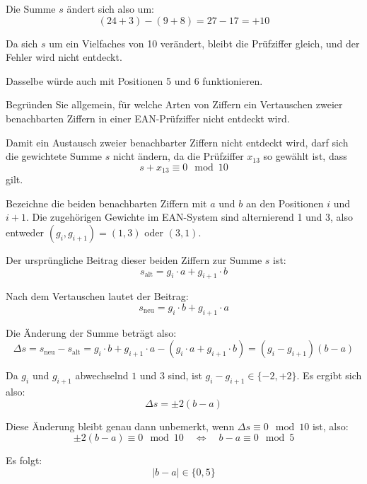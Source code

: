\begin{myexercise}
\begin{myanswer}
        Die Summe $s$ ändert sich also um:
        \[
            (24 + 3) - (9 + 8) = 27 - 17 = +10
        \]

        Da sich $s$ um ein Vielfaches von 10 verändert, bleibt die Prüfziffer gleich, und der Fehler wird nicht entdeckt.

        Dasselbe würde auch mit Positionen 5 und 6 funktionieren.
    \end{myanswer}

    \begin{mychallenge}
        Begründen Sie allgemein, für welche Arten von Ziffern ein Vertauschen zweier benachbarten Ziffern in einer \gls{EAN}-Prüfziffer nicht entdeckt wird.
        \begin{myanswer}
            Damit ein Austausch zweier benachbarter Ziffern nicht entdeckt wird, darf sich die gewichtete Summe $s$ nicht ändern, da die Prüfziffer $x_{13}$ so gewählt ist, dass
            \[
                s + x_{13} \equiv 0 \mod 10
            \]
            gilt.

            Bezeichne die beiden benachbarten Ziffern mit $a$ und $b$ an den Positionen $i$ und $i+1$. Die zugehörigen Gewichte im \gls{EAN}-System sind alternierend 1 und 3, also entweder $(g_i, g_{i+1}) = (1, 3)$ oder $(3, 1)$.

            Der ursprüngliche Beitrag dieser beiden Ziffern zur Summe $s$ ist:
            \[
                s_\text{alt} = g_i \cdot a + g_{i+1} \cdot b
            \]

            Nach dem Vertauschen lautet der Beitrag:
            \[
                s_\text{neu} = g_i \cdot b + g_{i+1} \cdot a
            \]

            Die Änderung der Summe beträgt also:
            \[
                \Delta s = s_\text{neu} - s_\text{alt} = g_i \cdot b + g_{i+1} \cdot a - (g_i \cdot a + g_{i+1} \cdot b)
                = (g_i - g_{i+1})(b - a)
            \]

            Da $g_i$ und $g_{i+1}$ abwechselnd $1$ und $3$ sind, ist $g_i - g_{i+1} \in \{-2, +2\}$. Es ergibt sich also:
            \[
                \Delta s = \pm 2 (b - a)
            \]

            Diese Änderung bleibt genau dann unbemerkt, wenn $\Delta s \equiv 0 \mod 10$ ist, also:
            \[
                \pm 2(b - a) \equiv 0 \mod 10 \quad \Leftrightarrow \quad b - a \equiv 0 \mod 5
            \]

            Es folgt:
            \[
                |b - a| \in \{0, 5\}
            \]


\end{myanswer}
\end{mychallenge}
\end{myexercise}
